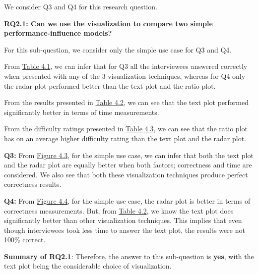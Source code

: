 We consider Q3 and Q4 for this research question.

\vskip 0.2in
\begin{mdframed}
\textbf{RQ2.1: Can we use the visualization to compare two simple performance-influence models?}
\end{mdframed}

For this sub-question, we consider only the simple use case for Q3 and Q4.

\begin{description}[leftmargin=0pt]
\item[Correctness: ] From \hyperref[table:correctness]{Table 4.1}, we can infer that for Q3 all the interviewees answered correctly when presented with any of the 3 visualization techniques, whereas for Q4 only the radar plot performed better than the text plot and the ratio plot.

\item[Time Measurements: ] From the results presented in \hyperref[table:time]{Table 4.2}, we can see that the text plot performed significantly better in terms of time measurements.

\item[Difficulty Ratings: ] From the difficulty ratings presented in \hyperref[table:rating]{Table 4.3}, we can see that the ratio plot has on an average higher difficulty rating than the text plot and the radar plot.

\end{description}


\textbf{Q3:} From \hyperref[figure:paretoTwoQ3]{Figure 4.3}, for the simple use case, we can infer that both the text plot and the radar plot are equally better when both factors; correctness and time are considered. We also see that both these visualization techniques produce perfect correctness results.

\textbf{Q4:} From \hyperref[figure:paretoTwoQ4]{Figure 4.4}, for the simple use case, the radar plot is better in terms of correctness measurements. But, from \hyperref[table:time]{Table 4.2}, we know the text plot does significantly better than other visualization techniques. This implies that even though interviewees took less time to answer the text plot, the results were not 100\% correct.

\textbf{Summary of RQ2.1}: Therefore, the answer to this sub-question is \textbf{yes}, with the text plot being the considerable choice of visualization.

